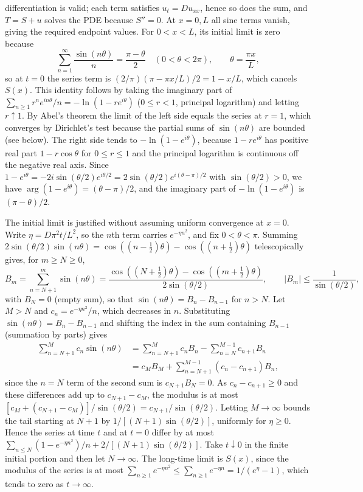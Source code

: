 differentiation is valid; each term satisfies $u_t=Du_{xx}$, hence so
does the sum, and $T=S+u$ solves the PDE because $S''=0$.
At $x=0,L$ all sine terms vanish, giving the required endpoint values.
For $0<x<L$, its initial limit is zero because
\[
\sum_{n=1}^{\infty}\frac{\sin(n\theta)}n
=\frac{\pi-\theta}{2}\quad(0<\theta<2\pi),
\qquad\theta=\frac{\pi x}L,
\]
so at $t=0$ the series term is $(2/\pi)(\pi-\pi x/L)/2=1-x/L$, which
cancels $S(x)$.
This identity follows by taking the imaginary part of
$\sum_{n\ge1}r^ne^{in\theta}/n=-\ln(1-re^{i\theta})$ ($0\le r<1$,
principal logarithm) and letting $r\uparrow1$.  By Abel's theorem the
limit of the left side equals the series at $r=1$, which converges by
Dirichlet's test because the partial sums of $\sin(n\theta)$ are
bounded (see below).  The right side tends to $-\ln(1-e^{i\theta})$,
because $1-re^{i\theta}$ has positive real part $1-r\cos\theta$ for
$0\le r\le1$ and the principal logarithm is continuous off the negative
real axis.
Since $1-e^{i\theta}=-2i\sin(\theta/2)e^{i\theta/2}
=2\sin(\theta/2)e^{i(\theta-\pi)/2}$ with $\sin(\theta/2)>0$, we have
$\arg(1-e^{i\theta})=(\theta-\pi)/2$, and the imaginary part of
$-\ln(1-e^{i\theta})$ is $(\pi-\theta)/2$.

The initial limit is justified without assuming uniform convergence at
$x=0$.  Write $\eta=D\pi^2t/L^2$, so the $n$th term carries
$e^{-\eta n^2}$, and fix $0<\theta<\pi$.  Summing
$2\sin(\theta/2)\sin(n\theta)=\cos((n-\tfrac12)\theta)
-\cos((n+\tfrac12)\theta)$ telescopically gives, for $m\ge N\ge0$,
\[
B_m=\sum_{n=N+1}^{m}\sin(n\theta)
=\frac{\cos((N+\frac12)\theta)-\cos((m+\frac12)\theta)}{2\sin(\theta/2)},
\qquad |B_m|\le\frac1{\sin(\theta/2)},
\]
with $B_N=0$ (empty sum), so that $\sin(n\theta)=B_n-B_{n-1}$ for
$n>N$.  Let $M>N$ and $c_n=e^{-\eta n^2}/n$, which decreases in $n$.
Substituting $\sin(n\theta)=B_n-B_{n-1}$ and shifting the index in the
sum containing $B_{n-1}$ (summation by parts) gives
\begin{align*}
\sum_{n=N+1}^{M}c_n\sin(n\theta)
&=\sum_{n=N+1}^{M}c_nB_n-\sum_{n=N}^{M-1}c_{n+1}B_n\\
&=c_MB_M+\sum_{n=N+1}^{M-1}(c_n-c_{n+1})B_n,
\end{align*}
since the $n=N$ term of the second sum is $c_{N+1}B_N=0$.
As $c_n-c_{n+1}\ge0$ and these differences add up to $c_{N+1}-c_M$,
the modulus is at most
$[c_M+(c_{N+1}-c_M)]/\sin(\theta/2)
=c_{N+1}/\sin(\theta/2)$.  Letting $M\to\infty$ bounds the tail
starting at $N+1$ by $1/[(N+1)\sin(\theta/2)]$, uniformly for
$\eta\ge0$.  Hence the series at time $t$ and at $t=0$ differ by at most
$\sum_{n\le N}(1-e^{-\eta n^2})/n+2/[(N+1)\sin(\theta/2)]$.
Take $t\downarrow0$ in the finite initial portion and then let
$N\to\infty$.  The long-time limit is $S(x)$, since the modulus of the
series is at most
$\sum_{n\ge1}e^{-\eta n^2}\le\sum_{n\ge1}e^{-\eta n}=1/(e^{\eta}-1)$,
which tends to zero as $t\to\infty$.

